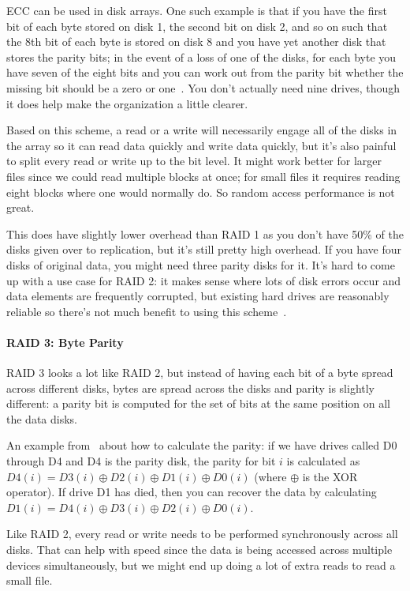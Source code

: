 ECC can be used in disk arrays. One such example is that if you have the first bit of each byte stored on disk 1, the second bit on disk 2, and so on such that the 8th bit of each byte is stored on disk 8 and you have yet another disk that stores the parity bits; in the event of a loss of one of the disks, for each byte you have seven of the eight bits and you can work out from the parity bit whether the missing bit should be a zero or one~\cite{osc}. You don't actually need nine drives, though it does help make the organization a little clearer.

Based on this scheme, a read or a write will necessarily engage all of the disks in the array so it can read data quickly and write data quickly, but it's also painful to split every read or write up to the bit level. It might work better for larger files since we could read multiple blocks at once; for small files it requires reading eight blocks where one would normally do. So random access performance is not great.

This does have slightly lower overhead than RAID 1 as you don't have 50\% of the disks given over to replication, but it's still pretty high overhead. If you have four disks of original data, you might need three parity disks for it. It's hard to come up with a use case for RAID 2: it makes sense where lots of disk errors occur and data elements are frequently corrupted, but existing hard drives are reasonably reliable so there's not much benefit to using this scheme~\cite{osi}.

\paragraph{RAID 3: Byte Parity}

RAID 3 looks a lot like RAID 2, but instead of having each bit of a byte spread across different disks, bytes are spread across the disks and parity is slightly different: a parity bit is computed for the set of bits at the same position on all the data disks.

An example from~\cite{osi} about how to calculate the parity: if we have drives called D0 through D4 and D4 is the parity disk, the parity for bit $i$ is calculated as $D4(i) = D3(i) \oplus D2(i) \oplus D1(i) \oplus D0(i)$ (where $\oplus$ is the XOR operator). If drive D1 has died, then you can recover the data by calculating $D1(i) = D4(i) \oplus D3(i) \oplus D2(i) \oplus D0(i)$.

Like RAID 2, every read or write needs to be performed synchronously across all disks. That can help with speed since the data is being accessed across multiple devices simultaneously, but we might end up doing a lot of extra reads to read a small file.

